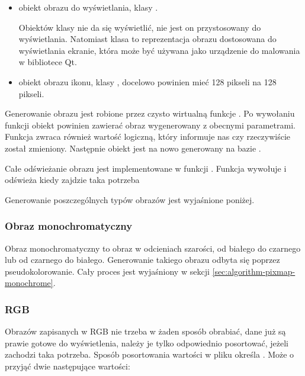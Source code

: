 \begin{itemize}
    \item {} obiekt obrazu do wyświetlania, klasy .

          Obiektów klasy  nie da się wyświetlić, nie jest on przystosowany do wyświetlania.
          Natomiast klasa  to reprezentacja obrazu dostosowana do wyświetlania ekranie, która może być używana jako urządzenie do malowania w bibliotece Qt.

    \item {} obiekt obrazu ikonu, klasy , docelowo powinien mieć 128 pikseli na 128 pikseli.

\end{itemize}

Generowanie obrazu jest robione przez czysto wirtualną funkcje .
Po wywołaniu funkcji obiekt  powinien zawierać obraz wygenerowany z obecnymi parametrami.
Funkcja zwraca również wartość logiczną, który informuje nas czy  rzeczywiście został zmieniony.
Następnie obiekt  jest na nowo generowany na bazie .

Całe odświeżanie obrazu jest implementowane w funkcji .
Funkcja wywołuje  i odświeża  kiedy zajdzie taka potrzeba

Generowanie poszczególnych typów obrazów jest wyjaśnione poniżej.


\subsubsection{Obraz monochromatyczny}
\par
Obraz monochromatyczny to obraz w odcieniach szarości, od białego do czarnego lub od czarnego do białego.
Generowanie takiego obrazu odbyta się poprzez pseudokolorowanie.
Cały proces jest wyjaśniony w sekcji \ref{sec:algorithm-pixmap-monochrome}.

\subsubsection{RGB}
Obrazów zapisanych w RGB nie trzeba w żaden sposób obrabiać, dane już są prawie gotowe do wyświetlenia, należy je tylko odpowiednio posortować, jeżeli zachodzi taka potrzeba.
Sposób posortowania wartości w pliku określa .
Może o przyjąć dwie następujące wartości:

